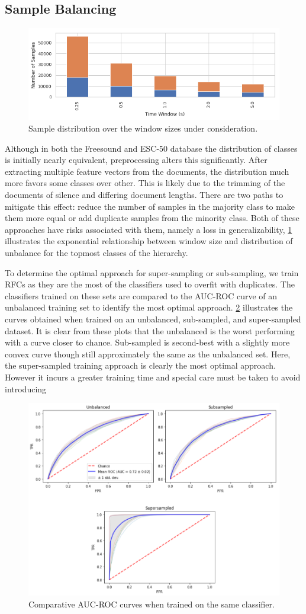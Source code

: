 \subsection{Sample Balancing}
\begin{figure}[h]
    \centering
    \includegraphics[width=.45\textwidth]{figures/Sample-Distribution.png}
    \caption{Sample distribution over the window sizes under consideration.}
    \label{fig:sample-distribution}
\end{figure}
Although in both the Freesound and ESC-50 database the distribution of classes is initially nearly equivalent, preprocessing alters this significantly. After extracting multiple feature vectors from the documents, the distribution much more favors some classes over other. This is likely due to the trimming of the documents of silence and differing document lengths. There are two paths to mitigate this effect: reduce the number of samples in the majority class to make them more equal or add duplicate samples from the minority class. Both of these approaches have risks associated with them, namely a loss in generalizability, \cref{fig:sample-distribution} illustrates the exponential relationship between window size and distribution of unbalance for the topmost classes of the hierarchy.

To determine the optimal approach for super-sampling or sub-sampling, we train RFCs as they are the most of the classifiers used to overfit with duplicates. The classifiers trained on these sets are compared to the AUC-ROC curve of an unbalanced training set to identify the most optimal approach. \cref{fig:sample-auc-roc} illustrates the curves obtained when trained on an unbalanced, sub-sampled, and super-sampled dataset. It is clear from these plots that the unbalanced is the worst performing with a curve closer to chance. Sub-sampled is second-best with a slightly more convex curve though still approximately the same as the unbalanced set. Here, the super-sampled training approach is clearly the most optimal approach. However it incurs a greater training time and special care must be taken to avoid introducing 

\begin{figure}[h]
    \centering
    \includegraphics[width=.45\textwidth]{figures/auc-roc-sampled.png}
    \caption{Comparative AUC-ROC curves when trained on the same classifier.}
    \label{fig:sample-auc-roc}
\end{figure}

